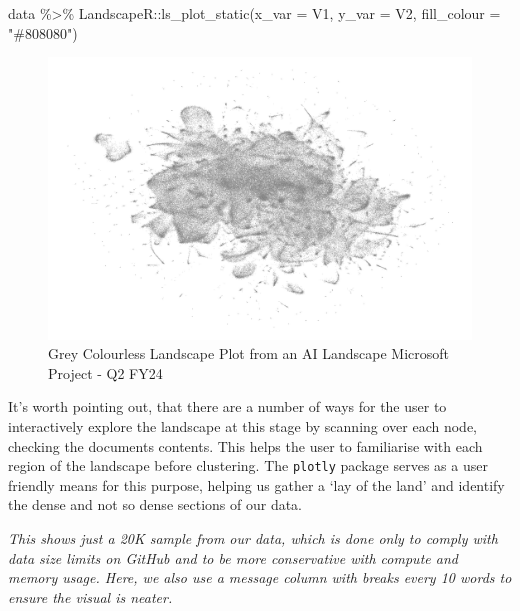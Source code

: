 \documentclass[
  letterpaper,
  DIV=11,
  numbers=noendperiod]{scrreprt}
\newenvironment{Shaded}{\begin{snugshade}}{\end{snugshade}}
\newcommand{\AttributeTok}[1]{\textcolor[rgb]{0.40,0.45,0.13}{#1}}
\newcommand{\FunctionTok}[1]{\textcolor[rgb]{0.28,0.35,0.67}{#1}}
\newcommand{\NormalTok}[1]{\textcolor[rgb]{0.00,0.23,0.31}{#1}}
\newcommand{\SpecialCharTok}[1]{\textcolor[rgb]{0.37,0.37,0.37}{#1}}
\newcommand{\StringTok}[1]{\textcolor[rgb]{0.13,0.47,0.30}{#1}}
\begin{document}
\begin{Shaded}
\begin{Highlighting}[]
\NormalTok{data }\SpecialCharTok{\%\textgreater{}\%} 
\NormalTok{  LandscapeR}\SpecialCharTok{::}\FunctionTok{ls\_plot\_static}\NormalTok{(}\AttributeTok{x\_var =}\NormalTok{ V1,}
                             \AttributeTok{y\_var =}\NormalTok{ V2,}
                             \AttributeTok{fill\_colour =} \StringTok{"\#808080"}\NormalTok{)}
\end{Highlighting}
\end{Shaded}

\begin{figure}[H]

{\centering \includegraphics{img/ai_landscape_grey.png}

}

\caption{Grey Colourless Landscape Plot from an AI Landscape Microsoft
Project - Q2 FY24}

\end{figure}%

It's worth pointing out, that there are a number of ways for the user to
interactively explore the landscape at this stage by scanning over each
node, checking the documents contents. This helps the user to
familiarise with each region of the landscape before clustering. The
\texttt{plotly} package serves as a user friendly means for this
purpose, helping us gather a `lay of the land' and identify the dense
and not so dense sections of our data.

\begin{tcolorbox}[enhanced jigsaw, colback=white, opacitybacktitle=0.6, coltitle=black, left=2mm, breakable, bottomtitle=1mm, toptitle=1mm, toprule=.15mm, colframe=quarto-callout-note-color-frame, titlerule=0mm, title=\textcolor{quarto-callout-note-color}{\faInfo}\hspace{0.5em}{Note}, colbacktitle=quarto-callout-note-color!10!white, rightrule=.15mm, bottomrule=.15mm, arc=.35mm, opacityback=0, leftrule=.75mm]

\emph{This shows just a 20K sample from our data, which is done only to
comply with data size limits on GitHub and to be more conservative with
compute and memory usage. Here, we also use a message column with breaks
every 10 words to ensure the visual is neater.}

\end{tcolorbox}
\end{document}
